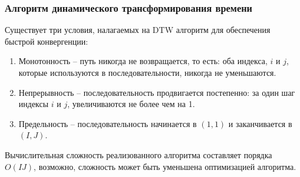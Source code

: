 \documentclass[slidestop, compress, mathserif, blackandwhite, utf8, serif, slidescentered]{beamer}
\begin{document}
\begin{frame}[plain]
	\frametitle{Алгоритм динамического трансформирования времени}
	Существует три условия, налагаемых на DTW алгоритм для обеспечения быстрой конвергенции:

	\begin{enumerate}[1)]
	\item Монотонность – путь никогда не возвращается, то есть: оба индекса, $i$ и $j$, которые используются в последовательности, никогда не уменьшаются. 

	\item Непрерывность – последовательность продвигается постепенно: за один шаг индексы $i$ и $j$, увеличиваются не более чем на 1.

	\item Предельность – последовательность начинается в $(1,1)$ и заканчивается в $(I,J)$.
	\end{enumerate}
	Вычислительная сложность реализованного алгоритма составляет порядка $O(IJ)$, возможно, сложность может быть уменьшена оптимизацией алгоритма.
\end{frame}
\end{document}

